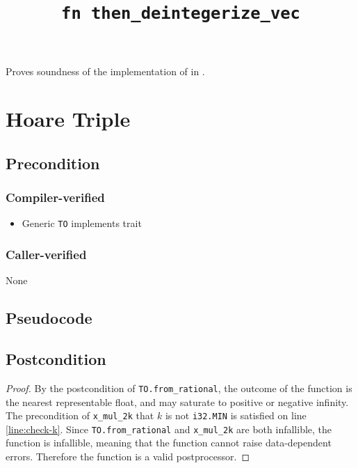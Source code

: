 \documentclass{article}
\title{\texttt{fn then\_deintegerize\_vec}}
\author{\MichaelShoemateAuthor}
\date{}
\begin{document}
\maketitle

\contrib
Proves soundness of the implementation of  in .

\section{Hoare Triple}
\subsection*{Precondition}
\subsubsection*{Compiler-verified}

\begin{itemize}
    \item Generic \texttt{TO} implements trait 
\end{itemize}

\subsubsection*{Caller-verified}
None

\subsection*{Pseudocode}


\subsection*{Postcondition}
\begin{theorem}
\end{theorem}

\begin{proof}
    By the postcondition of \texttt{TO.from\_rational},
    the outcome of the function is the nearest representable float,
    and may saturate to positive or negative infinity.
    The precondition of \texttt{x\_mul\_2k} that $k$ is not \texttt{i32.MIN} is satisfied on line \ref{line:check-k}.
    Since \texttt{TO.from\_rational} and \texttt{x\_mul\_2k} are both infallible,
    the function is infallible,
    meaning that the function cannot raise data-dependent errors.
    Therefore the function is a valid postprocessor.
\end{proof}
\end{document}
